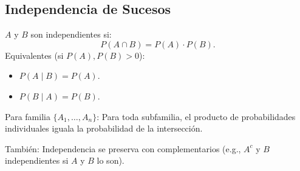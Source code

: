 \documentclass{article}
\begin{document}
\subsection{Independencia de Sucesos}
\(A\) y \(B\) son independientes si:
\[
P(A \cap B) = P(A) \cdot P(B).
\]
Equivalentes (si \(P(A), P(B) > 0\)):
\begin{itemize}
    \item \(P(A \mid B) = P(A)\).
    \item \(P(B \mid A) = P(B)\).
\end{itemize}
Para familia \(\{A_1, \dots, A_n\}\): Para toda subfamilia, el producto de probabilidades individuales iguala la probabilidad de la intersección.

También: Independencia se preserva con complementarios (e.g., \(A^c\) y \(B\) independientes si \(A\) y \(B\) lo son).
\end{document}
